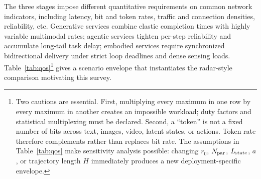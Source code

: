 \documentclass[letterpaper,journal]{IEEEtran}
\begin{document}
The three stages impose different quantitative requirements on common network
indicators, including latency, bit and token rates, traffic and
connection densities, reliability, etc. Generative
services combine elastic completion times with highly variable multimodal
rates; agentic services tighten per-step reliability and accumulate long-tail
task delay; embodied services require synchronized bidirectional delivery under
strict loop deadlines and dense sensing loads. Table~\ref{tab:qos}\footnote{Two cautions are essential. First, multiplying every maximum in one row by every maximum in another creates an impossible workload; duty factors and statistical multiplexing must be declared. Second, a ``token'' is not a fixed number of bits across text, images, video, latent states, or actions. Token rate therefore complements rather than replaces bit rate. The assumptions in Table~\ref{tab:qos} make sensitivity analysis possible: changing $r_0$,
$N_{\rm par}$, $L_{\rm state}$, $a$, or trajectory length $H$ immediately produces a new deployment-specific envelope.} gives a scenario envelope that instantiates the radar-style comparison motivating this
survey. 
\end{document}
